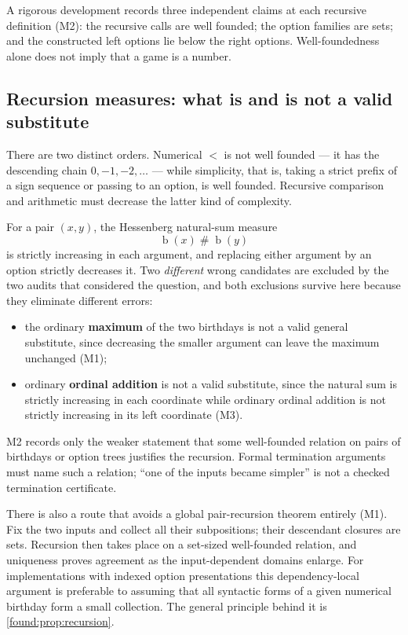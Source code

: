 \documentclass[11pt,letterpaper]{article}
\numberwithin{equation}{section}
\theoremstyle{definition}
\theoremstyle{remark}
\newcommand{\bd}{\operatorname{b}}
\begin{document}
A rigorous development records three independent claims at each recursive
definition (M2): the recursive calls are well founded; the option families are
sets; and the constructed left options lie below the right options.
Well-foundedness alone does not imply that a game is a number.

\subsection{Recursion measures: what is and is not a valid substitute}
\label{found:sub:recursionmeasure}
There are two distinct orders. Numerical $<$ is not well founded --- it has the
descending chain $0,-1,-2,\ldots$ --- while simplicity, that is, taking a strict
prefix of a sign sequence or passing to an option, is well founded. Recursive
comparison and arithmetic must decrease the latter kind of complexity.

For a pair $(x,y)$, the Hessenberg natural-sum measure
\begin{equation}\label{found:eq:natsum}
 \bd(x)\mathbin{\#}\bd(y)
\end{equation}
is strictly increasing in each argument, and replacing either argument by an
option strictly decreases it. Two \emph{different} wrong candidates are
excluded by the two audits that considered the question, and both exclusions
survive here because they eliminate different errors:
\begin{itemize}
\item the ordinary \textbf{maximum} of the two birthdays is not a valid general
substitute, since decreasing the smaller argument can leave the maximum
unchanged (M1);
\item ordinary \textbf{ordinal addition} is not a valid substitute, since the
natural sum is strictly increasing in each coordinate while ordinary ordinal
addition is not strictly increasing in its left coordinate (M3).
\end{itemize}
M2 records only the weaker statement that some well-founded relation on pairs of
birthdays or option trees justifies the recursion. Formal termination arguments
must name such a relation; ``one of the inputs became simpler'' is not a checked
termination certificate.

There is also a route that avoids a global pair-recursion theorem entirely
(M1). Fix the two inputs and collect all their subpositions; their descendant
closures are sets. Recursion then takes place on a set-sized well-founded
relation, and uniqueness proves agreement as the input-dependent domains
enlarge. For implementations with indexed option presentations this
dependency-local argument is preferable to assuming that all syntactic forms of
a given numerical birthday form a small collection. The general principle
behind it is \cref{found:prop:recursion}.
\end{document}
